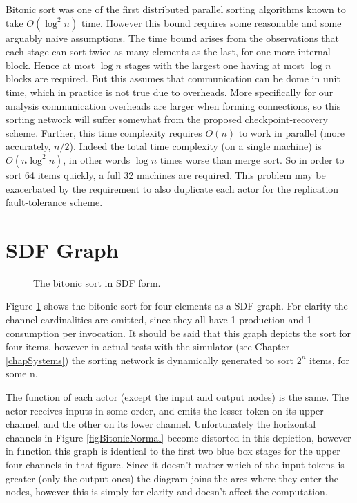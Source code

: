 Bitonic sort was one of the first distributed parallel sorting algorithms known to take $O(\log^2 n)$ time.
However this bound requires some reasonable and some arguably naive assumptions.
The time bound arises from the observations that each stage can sort twice as many elements as the last, for one more internal block.
Hence at most $\log n$ stages with the largest one having at most $\log n$ blocks are required.
But this assumes that communication can be dome in unit time, which in practice is not true due to overheads.
More specifically for our analysis communication overheads are larger when forming connections, so this sorting network will suffer somewhat from the proposed checkpoint-recovery scheme.
Further, this time complexity requires $O(n)$ to work in parallel (more accurately, $n/2$).
Indeed the total time complexity (on a single machine) is $O(n \log^2 n)$, in other words $\log n$ times worse than merge sort.
So in order to sort 64 items quickly, a full 32 machines are required.
This problem may be exacerbated by the requirement to also duplicate each actor for the replication fault-tolerance scheme.

\section{SDF Graph}

\begin{figure}
\begin{center}
	
\caption{The bitonic sort in SDF form.}
\label{figBitonicGraph}
\end{center}
\end{figure}

Figure \ref{figBitonicGraph} shows the bitonic sort for four elements as a SDF graph.
For clarity the channel cardinalities are omitted, since they all have 1 production and 1 consumption per invocation.
It should be said that this graph depicts the sort for four items, however in actual tests with the simulator (see Chapter \ref{chapSystems}) the sorting network is dynamically generated to sort $2^n$ items, for some n.

The function of each actor (except the input and output nodes) is the same.
The actor receives inputs in some order, and emits the lesser token on its upper channel, and the other on its lower channel.
Unfortunately the horizontal channels in Figure \ref{figBitonicNormal} become distorted in this depiction, however in function this graph is identical to the first two blue box stages for the upper four channels in that figure.
Since it doesn't matter which of the input tokens is greater (only the output ones) the diagram joins the arcs where they enter the nodes, however this is simply for clarity and doesn't affect the computation.

